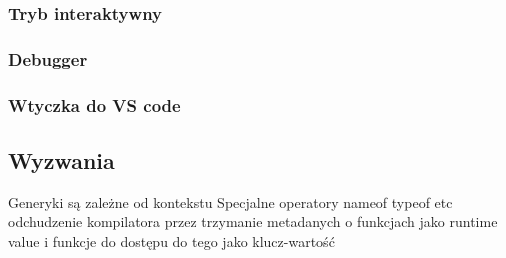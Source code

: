 \subsubsection{Tryb interaktywny}

\subsubsection{Debugger}

\subsubsection{Wtyczka do VS code}
\subsection{Wyzwania}
Generyki są zależne od kontekstu
Specjalne operatory nameof typeof etc
odchudzenie kompilatora przez trzymanie metadanych o funkcjach jako runtime value i funkcje do dostępu do tego jako klucz-wartość